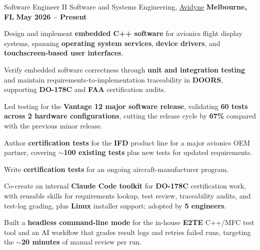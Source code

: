 


\begin{cventries}

\cventry
{Software Engineer II}
{Software and Systems Engineering, \href{https://www.avidyne.com/}{Avidyne}}
{\textbf{Melbourne, FL}}
{\textbf{May 2026 – Present}}
{
\begin{cvitems}
  \item Design and implement \textbf{embedded C++ software} for avionics flight display systems, spanning \textbf{operating system services}, \textbf{device drivers}, and \textbf{touchscreen-based user interfaces}.
  \item Verify embedded software correctness through \textbf{unit and integration testing} and maintain requirements-to-implementation traceability in \textbf{DOORS}, supporting \textbf{DO-178C} and \textbf{FAA} certification audits.
  \item Led testing for the \textbf{Vantage 12 major software release}, validating \textbf{60 tests across 2 hardware configurations}, cutting the release cycle by \textbf{67\%} compared with the previous minor release.
  \item Author \textbf{certification tests} for the \textbf{IFD} product line for a major avionics OEM partner, covering \textbf{$\sim$100 existing tests} plus new tests for updated requirements.
  \item Write \textbf{certification tests} for an ongoing aircraft-manufacturer program.
  \item Co-create an internal \textbf{Claude Code toolkit} for \textbf{DO-178C} certification work, with reusable skills for requirements lookup, test review, traceability audits, and test-log grading, plus \textbf{Linux} installer support; adopted by \textbf{5 engineers}.
  \item Built a \textbf{headless command-line mode} for the in-house \textbf{E2TE} C++/MFC test tool and an AI workflow that grades result logs and retries failed runs, targeting the \textbf{$\sim$20 minutes} of manual review per run.

\end{cvitems}}
\end{cventries}
